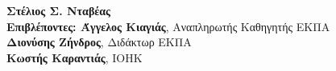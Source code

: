 \begin{center}
    \textbf{Στέλιος Σ. Νταβέας} \\
    \vspace{2.5cm}
    \textbf{Επιβλέποντες: Άγγελος Κιαγιάς}, Αναπληρωτής Καθηγητής ΕΚΠΑ\\
    \hspace{0.82cm}
    \textbf{Διονύσης Ζήνδρος}, Διδάκτωρ ΕΚΠΑ\\
    \hspace{-1.15cm}
    \textbf{\large Κωστής Καραντιάς}\large, IOHK

    \vspace{2.0cm}

    \date{\textbf{ΑΘΗΝΑ}, \\ \textbf{ΙΟΥΝΙΟΣ 2020}}
    \pagebreak
\end{center}

